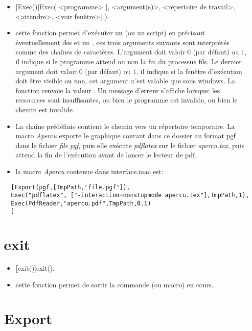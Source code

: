 \begin{itemize}
 \item \util \textbf[Exec()]{Exec( <programme> [, <argument(s)>, <répertoire de travail>, <attendre>, <voir fenêtre>] )}.
 \item \desc cette fonction permet d'exécuter un  (ou un script) en précisant éventuellement des  et un , ces trois arguments suivants sont interprétés comme des chaînes de caractères. L'argument  doit valoir $0$ (par défaut) ou $1$, il indique si le programme attend ou non la fin du processus fils. Le dernier argument  doit valoir $0$ (par défaut) ou $1$, il indique si la fenêtre d'exécution doit être visible ou non, cet argument n'est valable que sous windows. La fonction renvoie la valeur \Nil. Un message d'erreur s'affiche lorsque: les ressources sont insuffisantes, ou bien le programme est invalide, ou bien le chemin est invalide.
 \item La chaîne prédéfinie  contient le chemin vers un répertoire temporaire. La macro \textit{Apercu} exporte le graphique courant dans ce dossier au format pgf dans le fichier \textit{file.pgf}, puis elle exécute \textit{pdflatex} sur le fichier \textit{apercu.tex}, puis attend la fin de l'exécution avant de lancer le lecteur de pdf.
 \item \exem la macro \textsl{Apercu} contenue dans interface.mac est:
\end{itemize}

\begin{verbatim}
  [Export(pgf,[TmpPath,"file.pgf"]), 
  Exec("pdflatex", ["-interaction=nonstopmode apercu.tex"],TmpPath,1),
  Exec(PdfReader,"apercu.pdf",TmpPath,0,1)
  ]
\end{verbatim}

\section{exit}\label{cmdexit}

\begin{itemize}
 \item \util \textbf[exit()]{exit()}.
 \item \desc cette fonction permet de sortir la commande (ou macro) en cours.
\end{itemize}

\section{Export}\label{cmdExport}

